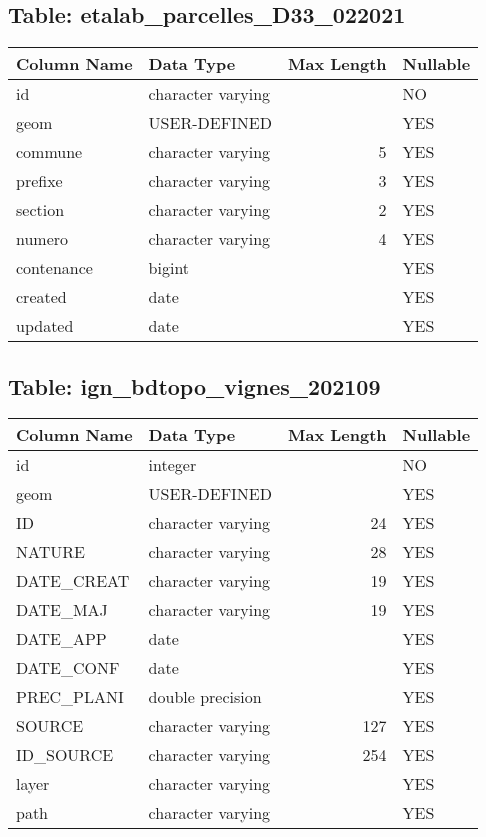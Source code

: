 \subsection*{Table: etalab_parcelles_D33_022021}
\begin{tabular}{llrl}
\hline
 Column Name   & Data Type         &   Max Length & Nullable   \\
\hline
 id            & character varying &              & NO         \\
 geom          & USER-DEFINED      &              & YES        \\
 commune       & character varying &            5 & YES        \\
 prefixe       & character varying &            3 & YES        \\
 section       & character varying &            2 & YES        \\
 numero        & character varying &            4 & YES        \\
 contenance    & bigint            &              & YES        \\
 created       & date              &              & YES        \\
 updated       & date              &              & YES        \\
\hline
\end{tabular}
\subsection*{Table: ign_bdtopo_vignes_202109}
\begin{tabular}{llrl}
\hline
 Column Name   & Data Type         &   Max Length & Nullable   \\
\hline
 id            & integer           &              & NO         \\
 geom          & USER-DEFINED      &              & YES        \\
 ID            & character varying &           24 & YES        \\
 NATURE        & character varying &           28 & YES        \\
 DATE_CREAT    & character varying &           19 & YES        \\
 DATE_MAJ      & character varying &           19 & YES        \\
 DATE_APP      & date              &              & YES        \\
 DATE_CONF     & date              &              & YES        \\
 PREC_PLANI    & double precision  &              & YES        \\
 SOURCE        & character varying &          127 & YES        \\
 ID_SOURCE     & character varying &          254 & YES        \\
 layer         & character varying &              & YES        \\
 path          & character varying &              & YES        \\
\hline
\end{tabular}
